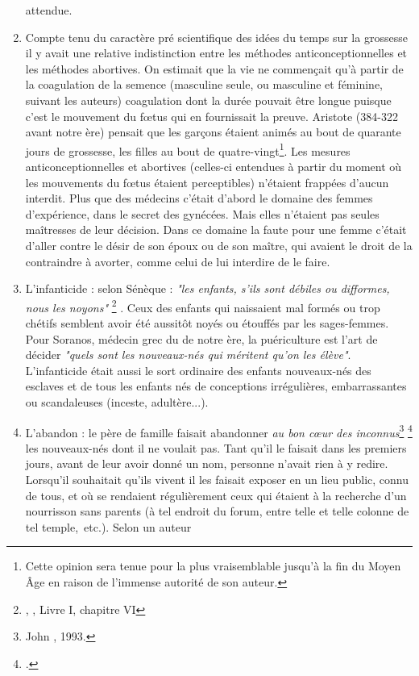 \begin{enumerate}
attendue.
\item Compte tenu du caractère pré scientifique des idées du temps
sur la grossesse il y avait une relative indistinction entre les méthodes anticonceptionnelles
et les méthodes abortives. On estimait que la vie ne
commençait qu'à partir de la coagulation de la semence (masculine seule,
ou masculine et féminine, suivant les auteurs) coagulation dont la durée
pouvait être longue puisque c'est le mouvement du fœtus qui en fournissait
la preuve. Aristote (384-322 avant notre ère) pensait que les garçons
étaient animés au bout de quarante jours de grossesse, les filles au bout
de quatre-vingt\footnote{Cette opinion sera tenue pour la plus vraisemblable jusqu'à
la fin du Moyen Âge en raison de l'immense autorité de son auteur.}.
Les mesures anticonceptionnelles et abortives (celles-ci entendues à partir du
moment où les mouvements du fœtus étaient perceptibles) n'étaient
frappées d'aucun interdit. Plus que des médecins c'était d'abord le domaine
des femmes d'expérience, dans le secret des gynécées. Mais elles n'étaient pas seules maîtresses de leur décision. Dans ce
domaine la faute pour une femme c'était d'aller contre le désir de son
époux ou de son maître, qui avaient le droit de la contraindre à avorter,
comme celui de lui interdire de le faire.
\item L'infanticide : selon Sénèque : {\emph{"les enfants, s'ils sont
débiles ou difformes, nous les noyons"}%
\footnote{, , Livre I, chapitre VI}%
}. Ceux des enfants qui naissaient mal formés ou
trop chétifs semblent avoir été aussitôt noyés ou étouffés par les sages-femmes. 
Pour \hbox{Soranos}, médecin grec du
 de notre ère, la puériculture est l'art de décider {\emph{"quels sont les
nouveaux-nés qui méritent qu'on les élève"}}. L'infanticide était aussi le sort ordinaire
des enfants nouveaux-nés des esclaves et de tous les enfants nés de conceptions
irrégulières, embarrassantes ou scandaleuses (inceste, adultère...).
\item L'abandon : le père de famille faisait abandonner {\emph{au bon cœur
des inconnus}\footnote{John , 1993.}%
\footcite{boswel1993}%
} les nou\-veaux-nés dont il ne voulait pas. Tant qu'il le faisait
dans les premiers jours, avant de leur avoir donné un nom, personne
n'avait rien à y redire. Lorsqu'il souhaitait qu'ils vivent il les faisait exposer
en un lieu public, connu de tous, et où se rendaient régulièrement
ceux qui étaient à la recherche d'un nourrisson sans parents (à tel endroit
du forum, entre telle et telle colonne de tel temple,~etc.). Selon un auteur

\end{enumerate}
